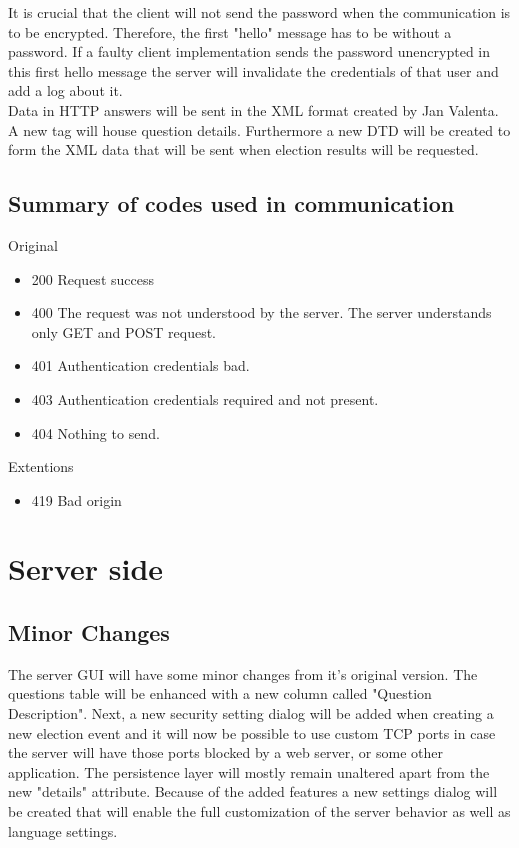 \documentclass[11pt,twoside,a4paper]{book}
\begin{document}
It is crucial that the client will not send the password when the communication is to be encrypted. Therefore, the first "hello" message has to be without a password. If a faulty client implementation sends the password unencrypted in this first hello message the server will invalidate the credentials of that user and add a log about it.\\

Data in HTTP answers will be sent in the XML format created by Jan Valenta. A new tag will house question details. Furthermore a new DTD will be created to form the XML data that will be sent when election results will be requested.

\subsection{Summary of codes used in communication}
Original\cite{bakalarkaJV}
\begin{itemize}
\item 200 Request success
\item 400 The request was not understood by the server. The server understands only GET and POST request.
\item 401 Authentication credentials bad.
\item 403 Authentication credentials required and not present.
\item 404 Nothing to send.\\
\end{itemize}

Extentions
\begin{itemize}
\item 419 Bad origin
\end{itemize}
\section{Server side}
\subsection{Minor Changes}
The server GUI will have some minor changes from it's original version. The questions table will be enhanced with a new column called "Question Description". Next, a new security setting dialog will be added when creating a new election event and it will now be possible to use custom TCP ports in case the server will  have those ports blocked by a web server, or some other application. The persistence layer will mostly remain unaltered apart from the new "details" attribute. Because of the added features a new settings dialog will be created that will enable the full customization of the server behavior as well as language settings.
\end{document}
